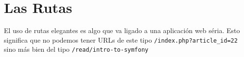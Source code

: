 \section{Las Rutas}
El uso de rutas elegantes es algo que va ligado a una aplicación web séria. Esto significa que no podemos tener URLs de este tipo \texttt{/index.php?article\_id=22} sino más bien del tipo \texttt{/read/intro-to-symfony}
